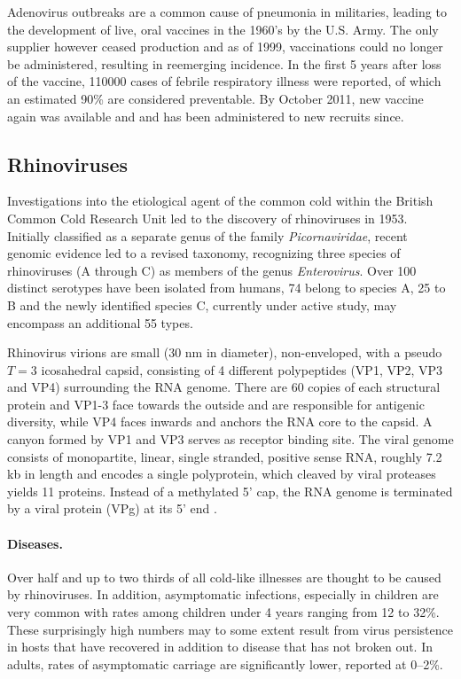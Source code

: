 Adenovirus outbreaks are a common cause of pneumonia in militaries, leading to the development of live, oral vaccines in the 1960's by the U.S. Army. The only supplier however ceased production and as of 1999, vaccinations could no longer be administered, resulting in reemerging incidence. In the first 5 years after loss of the vaccine, 110000 cases of febrile respiratory illness were reported, of which an estimated 90\% are considered preventable. By October 2011, new vaccine again was available and and has been administered to new recruits since.

\subsection{Rhinoviruses}
Investigations into the etiological agent of the common cold within the British Common Cold Research Unit led to the discovery of rhinoviruses in 1953. Initially classified as a separate genus of the family \textit{Picornaviridae}, recent genomic evidence led to a revised taxonomy, recognizing three species of rhinoviruses (A through C) as members of the genus \textit{Enterovirus}. Over 100 distinct serotypes have been isolated from humans, 74 belong to species A, 25 to B and the newly identified species C, currently under active study, may encompass an additional 55 types.

Rhinovirus virions are small (30 nm in diameter), non-enveloped, with a pseudo $T=3$ icosahedral capsid, consisting of 4 different polypeptides (VP1, VP2, VP3 and VP4) surrounding the RNA genome. There are 60 copies of each structural protein and VP1-3 face towards the outside and are responsible for antigenic diversity, while VP4 faces inwards and anchors the RNA core to the capsid. A canyon formed by VP1 and VP3 serves as receptor binding site. The viral genome consists of monopartite, linear, single stranded, positive sense RNA, roughly 7.2 kb in length and encodes a single polyprotein, which cleaved by viral proteases yields 11 proteins. Instead of a methylated 5' cap, the RNA genome is terminated by a viral protein (VPg) at its 5' end \citep{Jacobs2013}.

\paragraph{Diseases.}
Over half and up to two thirds of all cold-like illnesses are thought to be caused by rhinoviruses. In addition, asymptomatic infections, especially in children are very common with rates among children under 4 years ranging from 12 to 32\%. These surprisingly high numbers may to some extent result from virus persistence in hosts that have recovered in addition to disease that has not broken out. In adults, rates of asymptomatic carriage are significantly lower, reported at 0--2\%.

